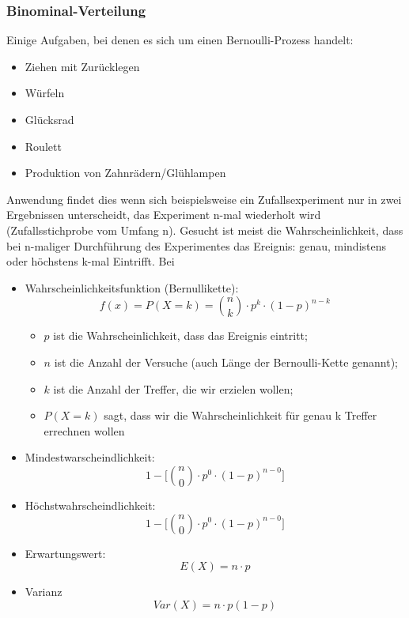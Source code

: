 \subsubsection{Binominal-Verteilung}
Einige Aufgaben, bei denen es sich um einen Bernoulli-Prozess handelt:
\begin{itemize}
\item Ziehen mit Zurücklegen
\item Würfeln
\item Glücksrad
\item Roulett
\item Produktion von Zahnrädern/Glühlampen
\end{itemize}
Anwendung findet dies wenn sich beispielsweise ein Zufallsexperiment nur in zwei Ergebnissen unterscheidt, das Experiment n-mal wiederholt wird (Zufallsstichprobe vom Umfang n). Gesucht ist meist die Wahrscheinlichkeit, dass bei n-maliger Durchführung des Experimentes das Ereignis: genau, mindistens oder höchstens k-mal Eintrifft. Bei 
\begin{itemize}
	\item Wahrscheinlichkeitsfunktion (Bernullikette): 
	\begin{equation}
	f(x)=P(X=k)={n \choose k}\cdot p^{k}\cdot(1-p)^{n-k}
	\end{equation}
		\begin{itemize}
    	\item $p$ ist die Wahrscheinlichkeit, dass das Ereignis eintritt;
		\item $n$ ist die Anzahl der Versuche (auch Länge der Bernoulli-Kette genannt);
		\item $k$ ist die Anzahl der Treffer, die wir erzielen wollen;
		\item $P(X=k)$ sagt, dass wir die Wahrscheinlichkeit für genau k Treffer errechnen wollen
		\end{itemize}
		\item Mindestwarscheindlichkeit:
		\begin{equation}
		1 - \Bigg[{n \choose 0}\cdot p^{0}\cdot(1-p)^{n-0}\Bigg]
		\end{equation}
		\item Höchstwahrscheindlichkeit:
		\begin{equation}
		1 - \Bigg[{n \choose 0}\cdot p^{0}\cdot(1-p)^{n-0}\Bigg]
		\end{equation}
	\item Erwartungswert: 
	\begin{equation}
	E(X) = n\cdot p
	\end{equation}
	\item Varianz
	\begin{equation}
	Var(X) = n\cdot p(1-p)
	\end{equation}
\end{itemize}

